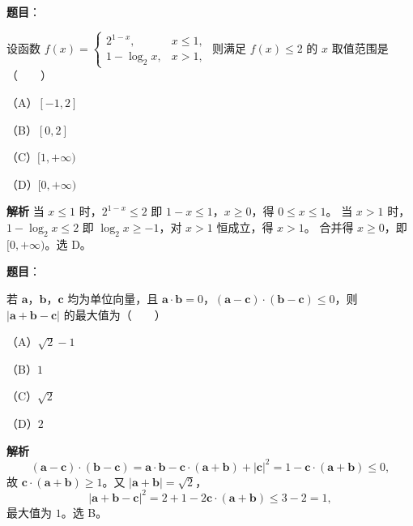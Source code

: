 \begin{answer}

\textbf{题目}：

设函数 $f(x)=\begin{cases}2^{1-x},&x\leqslant1,\\1-\log_2x,&x>1,\end{cases}$ 则满足 $f(x)\leqslant2$ 的 $x$ 取值范围是\mbox{（　　）}

（A）$[-1,2]$

（B）$[0,2]$

（C）$[1,+\infty)$

（D）$[0,+\infty)$

\textbf{解析}
当 $x\leqslant1$ 时，$2^{1-x}\leqslant2$ 即 $1-x\leqslant1$，$x\geqslant0$，得 $0\leqslant x\leqslant1$。
当 $x>1$ 时，$1-\log_2x\leqslant2$ 即 $\log_2x\geqslant-1$，对 $x>1$ 恒成立，得 $x>1$。
合并得 $x\geqslant0$，即 $[0,+\infty)$。选 D。


\end{answer}
\begin{answer}

\textbf{题目}：

若 $\boldsymbol a$，$\boldsymbol b$，$\boldsymbol c$ 均为单位向量，且 $\boldsymbol a\cdot\boldsymbol b=0$，$(\boldsymbol a-\boldsymbol c)\cdot(\boldsymbol b-\boldsymbol c)\leqslant0$，则 $|\boldsymbol a+\boldsymbol b-\boldsymbol c|$ 的最大值为\mbox{（　　）}

（A）$\sqrt2-1$

（B）$1$

（C）$\sqrt2$

（D）$2$

\textbf{解析}
\nopagebreak[4]
\[(\boldsymbol a-\boldsymbol c)\cdot(\boldsymbol b-\boldsymbol c)=\boldsymbol a\cdot\boldsymbol b-\boldsymbol c\cdot(\boldsymbol a+\boldsymbol b)+|\boldsymbol c|^2
=1-\boldsymbol c\cdot(\boldsymbol a+\boldsymbol b)\leqslant0,\]
故 $\boldsymbol c\cdot(\boldsymbol a+\boldsymbol b)\geqslant1$。又 $|\boldsymbol a+\boldsymbol b|=\sqrt2$，
\nopagebreak[4]
\[|\boldsymbol a+\boldsymbol b-\boldsymbol c|^2=2+1-2\boldsymbol c\cdot(\boldsymbol a+\boldsymbol b)\leqslant3-2=1,\]
最大值为 $1$。选 B。


\end{answer}
